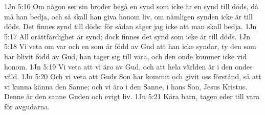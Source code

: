 1Jn 5:16  Om någon ser sin broder begå en synd som icke är en synd till döds, då må han bedja, och så skall han giva honom liv, om nämligen synden icke är till döds. Det finnes synd till döds; för sådan säger jag icke att man skall bedja.
1Jn 5:17  All orättfärdighet är synd; dock finnes det synd som icke är till döds.
1Jn 5:18  Vi veta om var och en som är född av Gud att han icke syndar, ty den som har blivit född av Gud, han tager sig till vara, och den onde kommer icke vid honom.
1Jn 5:19  Vi veta att vi äro av Gud, och att hela världen är i den ondes våld.
1Jn 5:20  Och vi veta att Guds Son har kommit och givit oss förstånd, så att vi kunna känna den Sanne; och vi äro i den Sanne, i hans Son, Jesus Kristus. Denne är den sanne Guden och evigt liv.
1Jn 5:21  Kära barn, tagen eder till vara för avgudarna.


